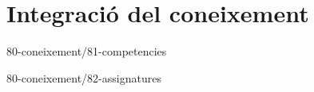\chapter{Integració del coneixement}

{80-coneixement/81-competencies}

{80-coneixement/82-assignatures}

